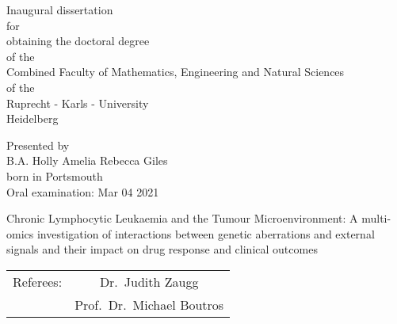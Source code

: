 \documentclass[11pt, a4paper, twosided]{book}
\begin{document}

\thispagestyle{empty}
  \begin{center}
  {\Large{Inaugural dissertation\\
    for\\
    obtaining the doctoral degree\\
    of the\\
    Combined Faculty of Mathematics, Engineering and Natural Sciences\\
    of the\\
    Ruprecht - Karls - University\\
    Heidelberg\\}} \vspace*{\fill}

  \Large{Presented by} \\\vspace{0.5cm}
  \Large{B.A. Holly Amelia Rebecca Giles} \\
  \Large{born in Portsmouth} \\
  \Large{Oral examination: Mar 04 2021}

\end{center}
\newpage\null\thispagestyle{empty}\newpage


\pagebreak
\thispagestyle{empty}
\null
\begin{center}
\Large{Chronic Lymphocytic Leukaemia and the Tumour Microenvironment: A multi-omics investigation of interactions between genetic aberrations and external signals and their impact on drug response and clinical outcomes} \\
\vspace*{\fill}
\begin{tabular}{ c c }
Referees: & Dr.~Judith Zaugg \\
          & Prof.~Dr.~Michael Boutros
\end{tabular}
\end{center}
\newpage\null\thispagestyle{empty}\newpage

\end{document}
